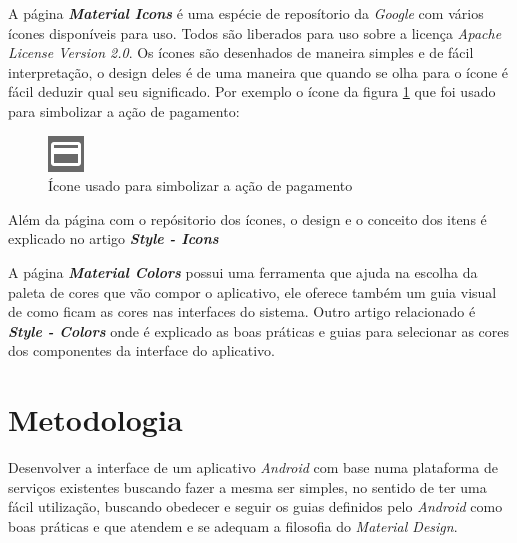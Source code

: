 \documentclass[hidelinks,12pt]{article}
\begin{document}
A p\'agina \textbf{\textit{Material Icons}} \cite{materialicon} \'e uma esp\'ecie de repos\'itorio da \textit{Google} com v\'arios \'icones dispon\'iveis para uso. Todos s\~ao liberados para uso sobre a licen\c{c}a \textit{Apache License Version 2.0}. Os \'icones s\~ao desenhados de maneira simples e de f\'acil interpreta\c{c}\~ao, o design deles \'e de uma maneira que quando se olha para o \'icone \'e f\'acil deduzir qual seu significado. Por exemplo o \'icone da figura \ref{icon_pay} que foi usado para simbolizar a a\c{c}\~ao de pagamento:
	\begin{figure}[h]
		\centering
		\includegraphics{pay_action_white}
		\caption{\'Icone usado para simbolizar a a\c{c}\~ao de pagamento}
		\label{icon_pay}
	\end{figure}

	Al\'em da p\'agina com o rep\'ositorio dos \'icones, o design e o conceito dos itens \'e explicado no artigo \textbf{\textit{Style - Icons}} \cite{materialiconguide}
	
A p\'agina \textbf{\textit{Material Colors}} \cite{materialcolors} possui uma ferramenta \cite{materialcolorpallete} que ajuda na escolha da paleta de cores que v\~ao compor o aplicativo, ele oferece tamb\'em um guia visual de como ficam as cores nas interfaces do sistema. Outro artigo relacionado \'e \textbf{\textit{Style - Colors}} \cite{materialcolors} onde \'e explicado as boas pr\'aticas e guias para selecionar as cores dos componentes da interface do aplicativo.

\newpage
\section{Metodologia}
Desenvolver a interface de um aplicativo \textit{Android} com base numa plataforma de servi\c{c}os existentes buscando fazer a mesma ser simples, no sentido de ter uma f\'acil utiliza\c{c}\~ao, buscando obedecer e seguir os guias definidos pelo \textit{Android} como boas pr\'aticas e que atendem e se adequam a filosofia do \textit{Material Design}.
\end{document}
